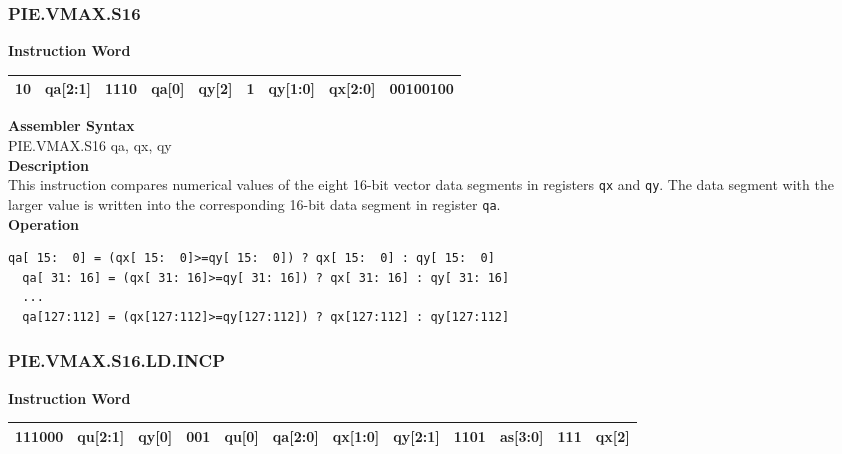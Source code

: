\newpage
\subsubsection{PIE.VMAX.S16}\label{instruction:PIEVMAXS16}
\setlength\tabcolsep{6pt}
\textbf{Instruction Word} \\
\begin{tabular}{|c|c|c|c|c|c|c|c|c|}
	\hline
	10 & qa[2:1] & 1110 & qa[0] & qy[2] & 1 & qy[1:0] & qx[2:0] & 00100100 \\
	\hline
\end{tabular}

\textbf{Assembler Syntax} \\
PIE.VMAX.S16 qa, qx, qy \\
\textbf{Description} \\
This instruction compares numerical values of the eight 16-bit vector data segments in registers \lstinline{qx} and \lstinline{qy}. The data segment with the larger value is written into the corresponding 16-bit data segment in register \lstinline{qa}.\\
\textbf{Operation}
\begin{lstlisting}[escapeinside=`?]
  qa[ 15:  0] = (qx[ 15:  0]>=qy[ 15:  0]) ? qx[ 15:  0] : qy[ 15:  0]
  qa[ 31: 16] = (qx[ 31: 16]>=qy[ 31: 16]) ? qx[ 31: 16] : qy[ 31: 16]
  ...
  qa[127:112] = (qx[127:112]>=qy[127:112]) ? qx[127:112] : qy[127:112]
\end{lstlisting}

\newpage
\subsubsection{PIE.VMAX.S16.LD.INCP}\label{instruction:PIEVMAXS16LDINCP}
\setlength\tabcolsep{6pt}
\textbf{Instruction Word} \\
\begin{tabular}{|c|c|c|c|c|c|c|c|c|c|c|c|}
	\hline
	111000 & qu[2:1] & qy[0] & 001 & qu[0] & qa[2:0] & qx[1:0] & qy[2:1] & 1101 & as[3:0] & 111 & qx[2] \\
	\hline
\end{tabular}


